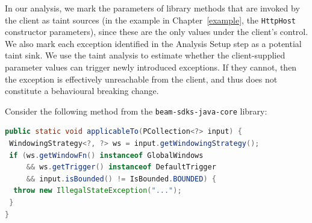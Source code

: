 In our analysis, we mark the parameters of library methods that are invoked by the client as taint sources (in the example in Chapter~\ref{example}, the \texttt{HttpHost} constructor parameters), since these are the only values under the client’s control. We also mark each exception identified in the Analysis Setup step as a potential taint sink. We use the taint analysis to estimate whether the client-supplied parameter values can trigger newly introduced exceptions. If they cannot, then the exception is effectively unreachable from the client, and thus does not constitute a behavioural breaking change. 



Consider the following method from the \texttt{beam-sdks-java-core} library:

\begin{lstlisting}[language=Java]
public static void applicableTo(PCollection<?> input) {
 WindowingStrategy<?, ?> ws = input.getWindowingStrategy();
 if (ws.getWindowFn() instanceof GlobalWindows
     && ws.getTrigger() instanceof DefaultTrigger
     && input.isBounded() != IsBounded.BOUNDED) {
  throw new IllegalStateException("...");
 }
}
\end{lstlisting}


